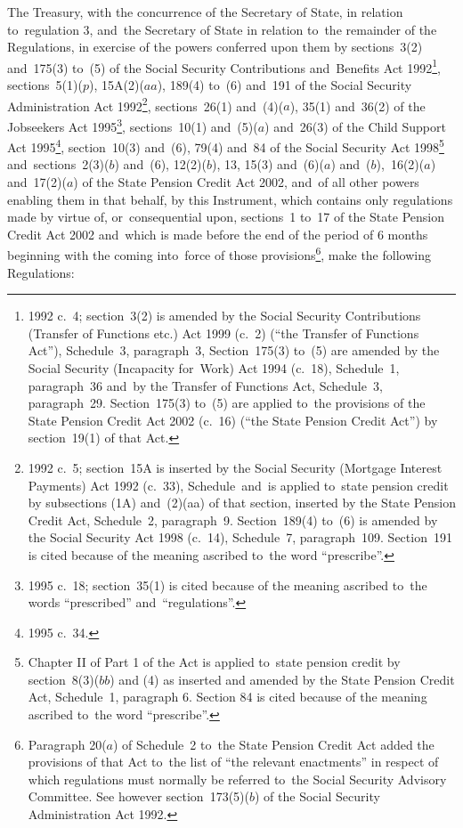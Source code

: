\documentclass[12pt,a4paper]{article}
\title{\regstitle}
\author{S.I.\ 2002 No.\ 3197}
\date{Made
19th December 2002\\
Laid before Parliament
23rd December 2002\\
Coming into~force\\
for~the purposes of regulations 1, 5, 6 and~7(4) 7th April 2003\\
for~all other purposes 6th October 2003
}
\begin{document}
\maketitle

\enlargethispage{\baselineskip}

\noindent
The Treasury, with the concurrence of the Secretary of State, in relation to~regulation 3, and~the Secretary of State in relation to~the remainder of the Regulations, in exercise of the powers conferred upon them by sections~3(2) and~175(3) to~(5) of the Social Security Contributions and~Benefits Act 1992\footnote{1992 c.~4; section~3(2) is amended by the Social Security Contributions (Transfer of Functions etc.) Act 1999 (c.~2) (“the Transfer of Functions Act”), Schedule~3, paragraph~3, Section~175(3) to~(5) are amended by the Social Security (Incapacity for~Work) Act 1994 (c.~18), Schedule~1, paragraph~36 and~by the Transfer of Functions Act, Schedule~3, paragraph~29. Section~175(3) to~(5) are applied to~the provisions of the State Pension Credit Act 2002 (c.~16) (“the State Pension Credit Act”) by section~19(1) of that Act.}, sections~5(1)($p$), 15A(2)($aa$), 189(4) to~(6) and~191 of the Social Security Administration Act 1992\footnote{1992 c.~5; section~15A is inserted by the Social Security (Mortgage Interest Payments) Act 1992 (c.~33), Schedule~and~is applied to~state pension credit by subsections (1A) and~(2)(aa) of that section, inserted by the State Pension Credit Act, Schedule~2, paragraph~9. Section~189(4) to~(6) is amended by the Social Security Act 1998 (c.~14), Schedule~7, paragraph~109. Section~191 is cited because of the meaning ascribed to~the word “prescribe”.}, sections~26(1) and~(4)($a$), 35(1) and~36(2) of the Jobseekers Act 1995\footnote{1995 c.~18; section~35(1) is cited because of the meaning ascribed to~the words “prescribed” and~“regulations”.}, sections~10(1) and~(5)($a$)  and~26(3) of the Child Support Act 1995\footnote{1995 c.~34.}, section~10(3) and~(6), 79(4) and~84 of the Social Security Act 1998\footnote{Chapter II of Part 1 of the Act is applied to~state pension credit by section~8(3)($bb$) and (4) as inserted and amended by the State Pension Credit Act, Schedule~1, paragraph 6. Section 84 is cited because of the meaning ascribed to~the word “prescribe”.} and~sections~2(3)($b$)  and~(6), 12(2)($b$), 13, 15(3) and~(6)($a$)  and~($b$),~16(2)($a$)  and~17(2)($a$)  of the State Pension Credit Act 2002, and~of all other powers enabling them in that behalf, by this Instrument, which contains only regulations made by virtue of, or~consequential upon, sections~1 to~17 of the State Pension Credit Act 2002 and~which is made before the end of the period of 6 months beginning with the coming into~force of those provisions\footnote{Paragraph 20($a$) of Schedule~2 to~the State Pension Credit Act added the provisions of that Act to~the list of “the relevant enactments” in respect of which regulations must normally be referred to~the Social Security Advisory Committee. See however section~173(5)($b$) of the Social Security Administration Act 1992.}, make the following Regulations: 
\end{document}
